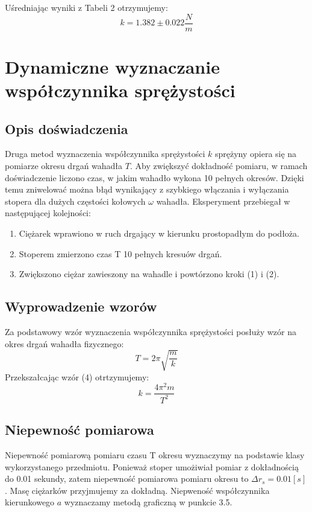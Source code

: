 \documentclass{article} %
\begin{document}
Uśredniając wyniki z Tabeli 2 otrzymujemy:
{\large
\begin{equation}
    k = 1.382 \pm0.022 \frac{N}{m}
\end{equation}
}

\section{Dynamiczne wyznaczanie współczynnika sprężystości}
\subsection{Opis doświadczenia}
Druga metod wyznaczenia współczynnika sprężystości $k$ sprężyny opiera się na pomiarze okresu drgań wahadła $T$. Aby zwiększyć dokładność pomiaru, w ramach doświadczenie liczono czas, w jakim wahadło wykona 10 pełnych okresów. Dzięki temu zniwelować można błąd wynikający z szybkiego włączania i wyłączania stopera dla dużych częstości kołowych $\omega$ wahadła. Eksperyment przebiegał w następującej kolejności:
\begin{enumerate}
    \item Ciężarek wprawiono w ruch drgający w kierunku prostopadłym do podłoża.
    \item Stoperem zmierzono czas T 10 pełnych kresuów drgań.
    \item Zwiększono ciężar zawieszony na wahadle i powtórzono kroki (1) i (2).
\end{enumerate}
\subsection{Wyprowadzenie wzorów}

Za podstawowy wzór wyznaczenia współczynnika sprężystości posłuży wzór na okres drgań wahadła fizycznego:
{\large
\begin{equation}
    T = 2\pi\sqrt{\frac{m}{k}}
\end{equation}
}
Przekszałcając wzór (4) otrtzymujemy:
{\large
\begin{equation}
    k = \frac{4\pi^2m}{T^2}
\end{equation}
}
\subsection{Niepewność pomiarowa}
Niepewność pomiarową pomiaru czasu T okresu wyznaczymy na podstawie klasy wykorzystanego przedmiotu. Ponieważ stoper umożiwiał pomiar z dokładnością do 0.01 sekundy, zatem niepewność pomiarowa pomiaru okresu to $\Delta r_s = 0.01 [s]$. Masę ciężarków przyjmujemy za dokładną. Niepweność współczynnika kierunkowego $a$ wyznaczamy metodą graficzną w punkcie 3.5. 
\end{document}
